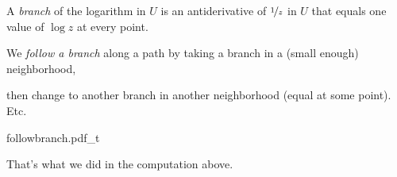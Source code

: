 \documentclass[10pt,aspectratio=169]{beamer}
\begin{document}
\begin{frame}
A \emph{branch} of the logarithm in $U$ is an antiderivative of
$\nicefrac{1}{z}$ in $U$ that equals one value of $\log z$ at every point.

\medskip
\pause

We \emph{follow a branch} along a path by taking a branch in a
(small enough) neighborhood,

\pause

then change to another branch in another
neighborhood (equal at some point). \pause Etc.

\medskip
\pause

\begin{center}
{followbranch.pdf_t}
\end{center}

\medskip
\pause

That's what we did in the computation above.
\end{frame}
\end{document}
